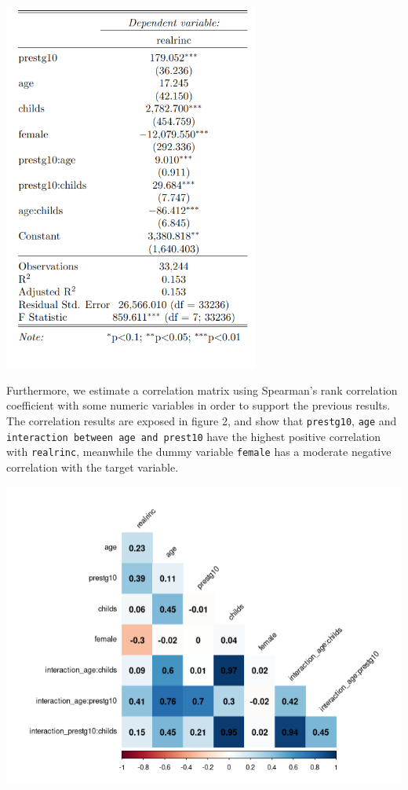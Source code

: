 \documentclass[11pt,a4paper]{article}
\let\origfigure\figure
\let\endorigfigure\endfigure
\renewenvironment{figure}[1][2] {
    \expandafter\origfigure\expandafter[H]
} {
    \endorigfigure
}
\begin{document}
\begin{figure}
\centering
\includegraphics[width=3.30208in,height=\textheight]{includes/reg_table.png}
\caption{Linear Model: Inclusion of Interaction Variables}
\end{figure}

Furthermore, we estimate a correlation matrix using Spearman's rank
correlation coefficient with some numeric variables in order to support
the previous results. The correlation results are exposed in figure 2,
and show that \texttt{prestg10}, \texttt{age} and
\texttt{interaction\ between\ age\ and\ prest10} have the highest
positive correlation with \texttt{realrinc}, meanwhile the dummy
variable \texttt{female} has a moderate negative correlation with the
target variable.

\begin{figure}
\centering
\includegraphics{includes/corr_matrix.png}
\caption{Correlation Matrix}
\end{figure}
\end{document}
